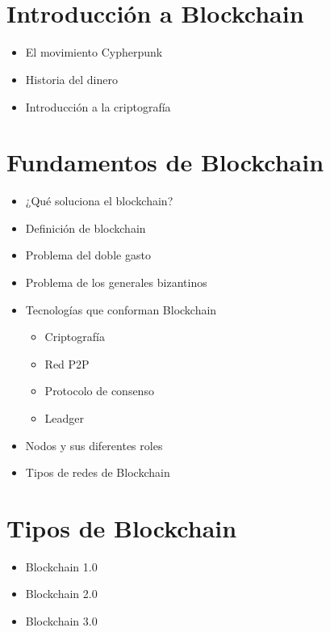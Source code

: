 \documentclass{/home/armando/Documentos/Cursos/LaTeX/Plantillas/lib/temarioptc}
\begin{document}
\vspace*{5mm}
\setlength{\parindent}{0pt}

\bigskip
{\color{colorPrimary}\Huge \mytitle }\\{\color{colorSecondary}\LARGE \mysubTitle } \\[2mm] \deliverDate

\normalcolor
\normalsize
\normalfont

\selectfont


\section{Introducción a Blockchain}
\begin{itemize}
	\item El movimiento Cypherpunk
	\item Historia del dinero
	\item Introducción a la criptografía
\end{itemize}
\section{Fundamentos de Blockchain}
\begin{itemize}
	\item ¿Qué soluciona el blockchain?
	\item Definición de blockchain
	\item Problema del doble gasto
	\item Problema de los generales bizantinos
	\item Tecnologías que conforman Blockchain
	\begin{itemize}
		\item Criptografía
		\item Red P2P
		\item Protocolo de consenso
		\item Leadger
	\end{itemize}
	\item Nodos y sus diferentes roles
	\item Tipos de redes de Blockchain
\end{itemize}
\section{Tipos de Blockchain}
\begin{itemize}
	\item Blockchain 1.0
	\item Blockchain 2.0
	\item Blockchain 3.0
\end{itemize}\newpage
\end{document}
